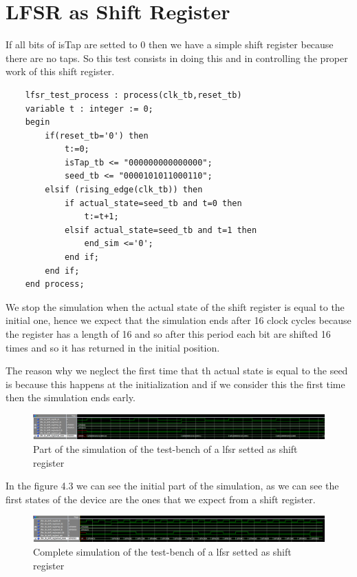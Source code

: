 \documentclass[a4paper]{report}
\begin{document}
\section{LFSR as Shift Register}
If all bits of isTap are setted to 0 then we have a simple shift register because there are no taps. So this test consists in doing this and in controlling the proper work of this shift register.

\begin{lstlisting}
	lfsr_test_process : process(clk_tb,reset_tb)
	variable t : integer := 0;
	begin
		if(reset_tb='0') then
			t:=0;
			isTap_tb <= "000000000000000";
			seed_tb <= "0000101011000110";
		elsif (rising_edge(clk_tb)) then
			if actual_state=seed_tb and t=0 then
				t:=t+1;
			elsif actual_state=seed_tb and t=1 then
				end_sim <='0';
			end if;
		end if;
	end process;
\end{lstlisting}
We stop the simulation when the actual state of the shift register is equal to the initial one, hence we expect that the simulation ends after 16 clock cycles because the register has a length of 16 and so after this period each bit are shifted 16 times and so it has returned in the initial position.

\noindent The reason why we neglect the first time that th actual state is equal to the seed is because this happens at the initialization and if we consider this the first time then the simulation ends early.

\begin{figure}[htpb]
	\centering
	\includegraphics[width=.6\textheight, height=.1\textheight]{img/tb/wave_lfsr_as_shift_reg_test_bin.png}
	\caption{Part of the simulation of the test-bench of a lfsr setted as shift register}
\end{figure}

\noindent In the figure 4.3 we can see the initial part of the simulation, as we can see the first states of the device are the ones that we expect from a shift register.

\begin{figure}[htpb]
	\centering
	\includegraphics[width=.6\textheight, height=.1\textheight]{img/tb/wave_lfsr_as_shift_reg_test_hex.png}
	\caption{Complete simulation of the test-bench of a lfsr setted as shift register}
\end{figure}
\end{document}
